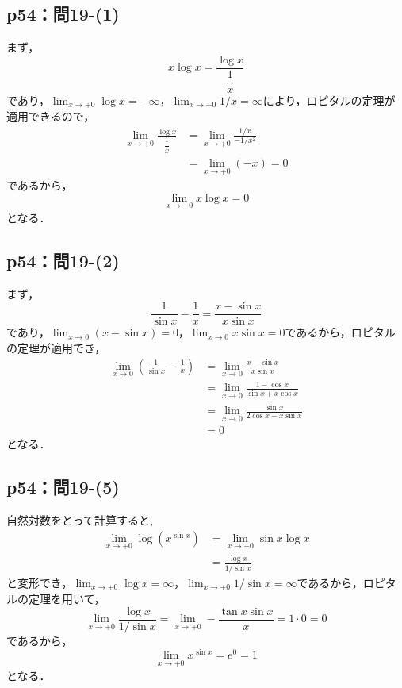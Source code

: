 \documentclass[uplatex,dvipdfmx,a4paper,10pt,fleqn]{jsarticle}
\begin{document}
\newpage 


\subsection*{p54：問19-(1)}

\begin{tleftbar}
    まず，
    \[
        x \log x = \frac{\log x}{\dfrac{1}{x}}
    \]
    であり，$\lim_{x \to +0} \log x =-\infty$，$\lim_{x \to +0} 1/x= \infty$により，ロピタルの定理が適用できるので，
    \begin{align*} 
        \lim_{x \to +0}  \frac{\log x}{\dfrac{1}{x}} & = \lim_{x \to +0} \frac{1/x}{-1/x^2} \\
        & =\lim_{x \to +0} (-x)=0
    \end{align*}
    であるから，
    \[
        \lim_{x \to +0}   x \log x  =0
    \]
    となる．
\end{tleftbar}


\subsection*{p54：問19-(2)}

\begin{tleftbar}
    まず，
    \[
        \frac{1}{\sin x}-\frac{1}{x} = \frac{x-\sin x}{x \sin x}
    \]
    であり，$\lim_{x \to 0} (x-\sin x)=0$，$\lim_{x \to 0} x \sin x=0$であるから，ロピタルの定理が適用でき，
    \begin{align*} 
        \lim_{x \to 0} \left (\frac{1}{\sin x}-\frac{1}{x} \right ) & = \lim_{x \to 0}  \frac{x-\sin x}{x \sin x} \\
        & =  \lim_{x \to 0} \frac{1-\cos x}{\sin x + x \cos x} \\
        & = \lim_{x \to 0} \frac{\sin x}{2\cos x -x\sin x} \\
        & = 0
    \end{align*} 
    となる．
\end{tleftbar}

\subsection*{p54：問19-(5)}

\begin{tleftbar}
    自然対数をとって計算すると,
    \begin{align*} 
       \lim_{x \to +0} \log ( x^{\sin x}) & = \lim_{x \to +0} \sin x \log x \\
       & = \frac{\log x}{1/\sin x}
    \end{align*} 
    と変形でき，$\lim_{x \to +0} \log x = \infty$，$\lim_{x \to +0} 1/\sin x=\infty$であるから，ロピタルの定理を用いて，
    \[
        \lim_{x \to +0} \frac{\log x}{1/\sin x} = \lim_{x \to +0}  -\frac{\tan x \sin x }{x } = 1 \cdot 0=0
    \]
    であるから，
    \[
        \lim_{x \to +0} x^{\sin x} = e^0=1
    \]
    となる．
\end{tleftbar}
\end{document}
